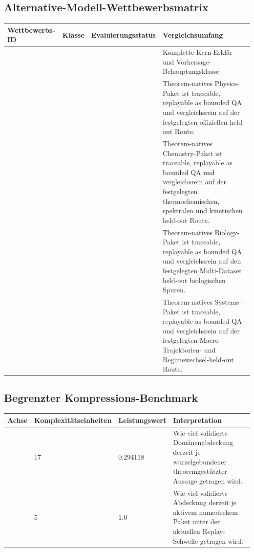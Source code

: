\subsection{Alternative-Modell-Wettbewerbsmatrix}
\begin{center}
\begin{tabular}{@{}L{0.22\textwidth}L{0.16\textwidth}L{0.20\textwidth}L{0.34\textwidth}@{}}
\toprule
Wettbewerbs-ID & Klasse & Evaluierungsstatus & Vergleichsumfang \\
\midrule
{} &  &  & Komplette Kern-Erklär- und Vorhersage-Behauptungsklasse \\
 &  &  & Theorem-natives Physics-Paket ist traceable, replayable as bounded QA und vergleichsrein auf der festgelegten offiziellen held-out Route. \\
 &  &  & Theorem-natives Chemistry-Paket ist traceable, replayable as bounded QA und vergleichsrein auf der festgelegten thermochemischen, spektralen und kinetischen held-out Route. \\
 &  &  & Theorem-natives Biology-Paket ist traceable, replayable as bounded QA und vergleichsrein auf den festgelegten Multi-Dataset held-out biologischen Spuren. \\
 &  &  & Theorem-natives Systems-Paket ist traceable, replayable as bounded QA und vergleichsrein auf der festgelegten Macro-Trajektorien- und Regimewechsel-held-out Route. \\
\bottomrule
\end{tabular}
\end{center}

\subsection{Begrenzter Kompressions-Benchmark}
\begin{center}
\begin{tabular}{@{}L{0.24\textwidth}L{0.12\textwidth}L{0.13\textwidth}L{0.41\textwidth}@{}}
\toprule
Achse & Komplexitätseinheiten & Leistungswert & Interpretation \\
\midrule
{} & 17 & 0.294118 & Wie viel validierte Domänenabdeckung derzeit je wurzelgebundener theoremgestützter Aussage getragen wird. \\
 & 5 & 1.0 & Wie viel validierte Abdeckung derzeit je aktivem numerischem Paket unter der aktuellen Replay-Schwelle getragen wird. \\
\bottomrule
\end{tabular}
\end{center}
